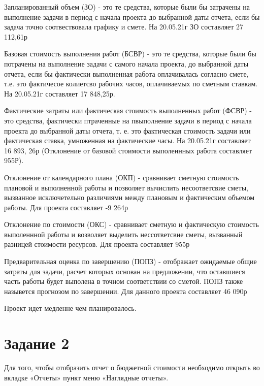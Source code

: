 Запланированный объем (ЗО) - это те средства, которые были бы затрачены на выполнение задачи в период с начала проекта до выбранной даты отчета, если бы задача точно соотвествовала графику и смете. На 20.05.21г ЗО составляет 27 112,61р


Базовая стоимость выполнения работ (БСВР) - это те средства, которые были бы потрачены на выполнение задачи с самого начала проекта, до выбранной даты отчета, если бы фактически выполненная работа оплачивалась согласно смете, т.е. это фактичесое колиетсво рабочих часов, оплачиваемых по сметным ставкам. На 20.05.21г составляет 17 848,25р.


Фактические затраты или фактическая стоимость выполненных работ (ФСВР) - это средства, фактически птраченные на пвыполнение задачи в период с начала проекта до выбранной даты отчета, т. е. это фактическая стоимость задачи или фактическая ставка, умноженная на фактические часы. На 20.05.21г составляет 16 893, 26р (Отклонение от базовой стоимости выполеннных работа составляет 955Р).


Отклонение от календарного плана (ОКП) - сравнивает сметную стоимость плановой и выполненной работы и позволяет вычислить несоответсвие сметы, вызванное исключетельно различиями между плановым и фактическим объемом работы. Для проекта составляет  -9 264р


Отклонение по стоимости (ОКС) - сравнивает сметную и фактическую стоимость выполеннной работы и возволяет выделить нессответсвие сметы, вызванный разницей стоимости ресурсов. Для проекта составляет 955р


Предварительная оценка по завершению (ПОПЗ) - отображает ожидаемые общие затраты для задачи, расчет которых основан на предложении, что оставшиеся часть работы будет выполена в точном соответствии со сметой. ПОПЗ также назывется прогнозом по завершении. Для данного проекта составляет 46 090р


Проект идет  медленне чем планировалось.

\section{Задание 2}
Для того, чтобы отобразить отчет о бюджетной стоимости необходимо открыть во вкладке «Отчеты» пункт меню «Наглядные отчеты».







